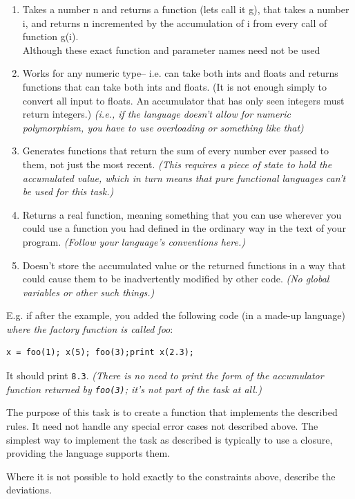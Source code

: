 \begin{enumerate}
\item
  Takes a number n and returns a function (lets call it g), that takes a
  number i, and returns n incremented by the accumulation of i from
  every call of function g(i).\\Although these exact function and
  parameter names need not be used
\item
  Works for any numeric type-- i.e. can take both ints and floats and
  returns functions that can take both ints and floats. (It is not
  enough simply to convert all input to floats. An accumulator that has
  only seen integers must return integers.) \emph{(i.e., if the language
  doesn't allow for numeric polymorphism, you have to use overloading or
  something like that)}
\item
  Generates functions that return the sum of every number ever passed to
  them, not just the most recent. \emph{(This requires a piece of state
  to hold the accumulated value, which in turn means that pure
  functional languages can't be used for this task.)}
\item
  Returns a real function, meaning something that you can use wherever
  you could use a function you had defined in the ordinary way in the
  text of your program. \emph{(Follow your language's conventions
  here.)}
\item
  Doesn't store the accumulated value or the returned functions in a way
  that could cause them to be inadvertently modified by other code.
  \emph{(No global variables or other such things.)}
\end{enumerate}

E.g. if after the example, you added the following code (in a made-up
language) \emph{where the factory function is called foo}:

\begin{verbatim}
x = foo(1); x(5); foo(3);print x(2.3);
\end{verbatim}

It should print \texttt{8.3}. \emph{(There is no need to print the form
of the accumulator function returned by \texttt{foo(3)}; it's not part
of the task at all.)}

The purpose of this task is to create a function that implements the
described rules. It need not handle any special error cases not
described above. The simplest way to implement the task as described
is typically to use a closure, providing the language supports them.

Where it is not possible to hold exactly to the constraints above,
describe the deviations.


